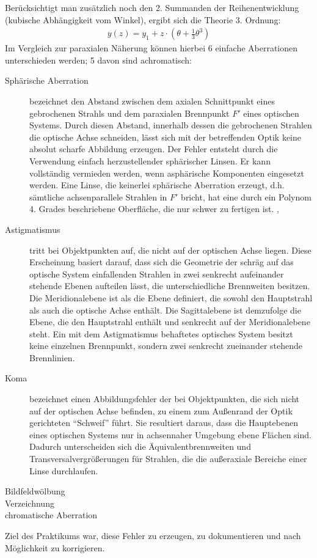 Berücksichtigt man zusätzlich noch den 2. Summanden der Reihenentwicklung (kubische Abhängigkeit vom Winkel), ergibt sich die Theorie 3. Ordnung:
\begin{align*}
y(z)=y_1 + z \cdot \left( \theta + \frac{1}{3}\theta^3\right) 
\end{align*}
Im Vergleich zur paraxialen Näherung können hierbei 6 einfache Aberrationen unterschieden werden; 5 davon sind achromatisch:
\begin{description}
	\item[Sphärische Aberration] bezeichnet den Abstand zwischen dem axialen Schnittpunkt eines gebrochenen Strahls und dem paraxialen Brennpunkt $F'$ eines optischen Systems. Durch diesen Abstand, innerhalb dessen die gebrochenen Strahlen die optische Achse schneiden, lässt sich mit der betreffenden Optik keine absolut scharfe Abbildung erzeugen. Der Fehler entsteht durch die Verwendung einfach herzustellender sphärischer Linsen. Er kann vollständig vermieden werden, wenn asphärische Komponenten eingesetzt werden. Eine Linse, die keinerlei sphärische Aberration erzeugt, d.h. sämtliche achsenparallele Strahlen in $F'$ bricht, hat eine durch ein Polynom 4. Grades beschriebene Oberfläche, die nur schwer zu fertigen ist. \cite[416ff.]{hecht2014optik}, \cite[Vol. 1, 27-2ff.]{feynman2011flp}
	\item[Astigmatismus] tritt bei Objektpunkten auf, die nicht auf der optischen Achse liegen. Diese Erscheinung basiert darauf, dass sich die Geometrie der schräg auf das optische System einfallenden Strahlen in zwei senkrecht aufeinander stehende Ebenen aufteilen lässt, die unterschiedliche Brennweiten besitzen. Die Meridionalebene ist als die Ebene definiert, die sowohl den Hauptstrahl als auch die optische Achse enthält. Die Sagittalebene ist demzufolge die Ebene, die den Hauptstrahl enthält und senkrecht auf der Meridionalebene steht. Ein mit dem Astigmatismus behaftetes optisches System besitzt keine einzelnen Brennpunkt, sondern zwei senkrecht zueinander stehende Brennlinien. \cite[428ff.]{hecht2014optik}
	\item[Koma] bezeichnet einen Abbildungsfehler der bei Objektpunkten, die sich nicht auf der optischen Achse befinden, zu einem zum Außenrand der Optik gerichteten "`Schweif"' führt. Sie resultiert daraus, dass die Hauptebenen eines optischen Systems nur in achsennaher Umgebung ebene Flächen sind. Dadurch unterscheiden sich die Äquivalentbrennweiten und Transversalvergrößerungen für Strahlen, die die außeraxiale Bereiche einer Linse durchlaufen. \cite[423ff.]{hecht2014optik}
	\item[Bildfeldwölbung]
	\item[Verzeichnung]
	\item[chromatische Aberration]
\end{description}

Ziel des Praktikums war, diese Fehler zu erzeugen, zu dokumentieren und nach Möglichkeit zu korrigieren.
